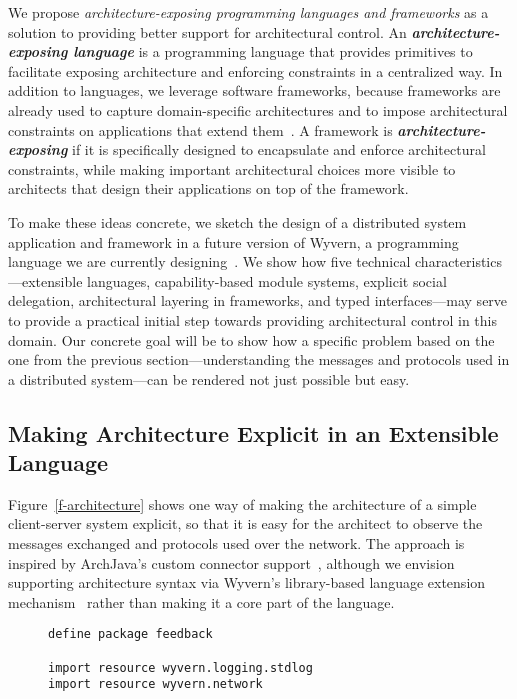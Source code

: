\documentclass[runningheads]{llncs}
\begin{document}
\begin{sloppypar}
We propose \emph{architecture-exposing programming languages and frameworks} as a solution to providing better support for architectural control.  An \textit{\textbf{architecture-exposing language}} is a programming language that provides primitives to facilitate exposing architecture and enforcing constraints in a centralized way.  In addition to languages, we leverage software frameworks, because frameworks are already used to capture domain-specific architectures and to impose architectural constraints on applications that extend them~\cite{JaspanThesis}.  A framework is \emph{\textbf{architecture-exposing}} if it is specifically designed to encapsulate and enforce architectural constraints, while making important architectural choices more visible to architects that design their applications on top of the framework.

To make these ideas concrete, we sketch the design of a distributed system application and framework in a future version of Wyvern, a programming language we are currently designing~\cite{NKB+13}.  We show how five technical characteristics---extensible languages, capability-based module systems, explicit social delegation, architectural layering in frameworks, and typed interfaces---may serve to provide a practical initial step towards providing architectural control in this domain.  Our concrete goal will be to show how a specific problem based on the one from the previous section---understanding the messages and protocols used in a distributed system---can be rendered not just possible but easy.


\subsection{Making Architecture Explicit in an Extensible Language}
   
Figure~\ref{f-architecture} shows one way of making the architecture of a simple client-server system explicit, so that it is easy for the architect to observe the messages exchanged and protocols used over the network.  The approach is inspired by ArchJava's custom connector support~\cite{ASCN03}, although we envision supporting architecture syntax via Wyvern's library-based language extension mechanism~\cite{TSLs-ECOOP14} rather than making it a core part of the language.

\begin{figure}[t]
\begin{lstlisting}
define package feedback

import resource wyvern.logging.stdlog
import resource wyvern.network


\end{lstlisting}
\end{figure}
\end{sloppypar}
\end{document}
